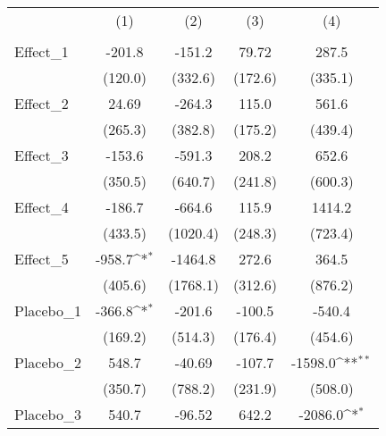{
\def\sym#1{\ifmmode^{#1}\else\(^{#1}\)\fi}
\begin{tabular}{l*{4}{c}}
\toprule
            &\multicolumn{1}{c}{(1)}&\multicolumn{1}{c}{(2)}&\multicolumn{1}{c}{(3)}&\multicolumn{1}{c}{(4)}\\
            &\multicolumn{1}{c}{} &\multicolumn{1}{c}{} &\multicolumn{1}{c}{} &\multicolumn{1}{c}{} \\
\midrule
Effect\_1    &      -201.8         &      -151.2         &       79.72         &       287.5         \\
            &     (120.0)         &     (332.6)         &     (172.6)         &     (335.1)         \\
\addlinespace
Effect\_2    &       24.69         &      -264.3         &       115.0         &       561.6         \\
            &     (265.3)         &     (382.8)         &     (175.2)         &     (439.4)         \\
\addlinespace
Effect\_3    &      -153.6         &      -591.3         &       208.2         &       652.6         \\
            &     (350.5)         &     (640.7)         &     (241.8)         &     (600.3)         \\
\addlinespace
Effect\_4    &      -186.7         &      -664.6         &       115.9         &      1414.2         \\
            &     (433.5)         &    (1020.4)         &     (248.3)         &     (723.4)         \\
\addlinespace
Effect\_5    &      -958.7\sym{*}  &     -1464.8         &       272.6         &       364.5         \\
            &     (405.6)         &    (1768.1)         &     (312.6)         &     (876.2)         \\
\addlinespace
Placebo\_1   &      -366.8\sym{*}  &      -201.6         &      -100.5         &      -540.4         \\
            &     (169.2)         &     (514.3)         &     (176.4)         &     (454.6)         \\
\addlinespace
Placebo\_2   &       548.7         &      -40.69         &      -107.7         &     -1598.0\sym{**} \\
            &     (350.7)         &     (788.2)         &     (231.9)         &     (508.0)         \\
\addlinespace
Placebo\_3   &       540.7         &      -96.52         &       642.2         &     -2086.0\sym{*}  \\

\end{tabular}}
